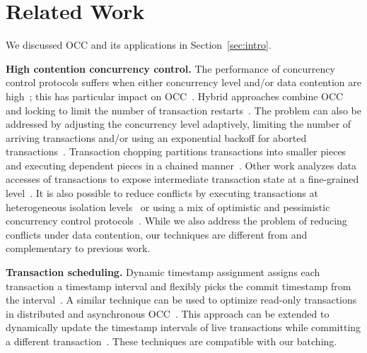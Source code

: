 \section{Related Work}\label{sec:relwork}
We discussed OCC and its applications in Section~\ref{sec:intro}. 

{\bf High contention concurrency control.}
The performance of concurrency control protocols suffers when either concurrency level and/or data contention are high~\cite{franaszek1985limitations, appuswamy17vldb}; this has particular impact on OCC~\cite{agrawal1987concurrency}. Hybrid approaches combine OCC and locking to limit the number of transaction restarts~\cite{thomasian1998distributed,yu1992analysis}. The problem can also be addressed by adjusting the concurrency level adaptively, limiting the number of arriving transactions and/or using an exponential backoff for aborted transactions~. Transaction chopping partitions transactions into smaller pieces and executing dependent pieces in a chained manner~\cite{mu2014extracting,shasha1995transaction,xie2015high}. Other work analyzes data accesses of transactions to expose intermediate transaction state at a fine-grained level~\cite{wang2016scaling}. It is also possible to reduce conflicts by executing transactions at heterogeneous isolation levels~\cite{xie2014salt,xie2015high} or using a mix of optimistic and pessimistic concurrency control protocols~\cite{wang2016mostly}.
While we also address the problem of reducing conflicts under data contention, our techniques are different from and complementary to previous work.

{\bf Transaction scheduling.}
Dynamic timestamp assignment assigns each transaction a timestamp interval and flexibly picks the commit timestamp from the interval~\cite{bayer1982dynamic}. A similar technique can be used to optimize read-only transactions in distributed and asynchronous OCC~\cite{ding2015centiman}. This approach can be extended to dynamically update the timestamp intervals of live transactions while committing a different transaction~\cite{boksenbaum1987concurrent}.
 These techniques are compatible with our batching.

